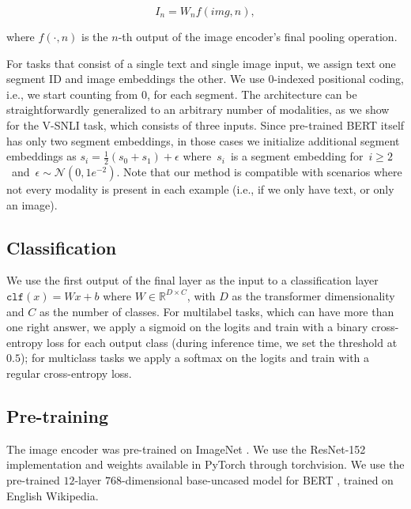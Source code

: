 \documentclass[11pt,a4paper]{article}
\begin{document}
\begin{equation}
    I_n = W_n f(img, n),
\end{equation}

where $f(\cdot, n)$ is the $n$-th output of the image encoder's final pooling operation.

For tasks that consist of a single text and single image input, we assign text one segment ID and image embeddings the other. We use $0$-indexed positional coding, i.e., we start counting from $0$, for each segment. The architecture can be straightforwardly generalized to an arbitrary number of modalities, as we show for the V-SNLI task, which consists of three inputs. Since pre-trained BERT itself has only two segment embeddings, in those cases we initialize additional segment embeddings as $s_i=\frac{1}{2}(s_0+s_1)+\epsilon$ where~$s_i$~is a segment embedding for~$i\geq 2$~and~$\epsilon\sim\mathcal{N}(0,1e^{-2})$. Note that our method is compatible with scenarios where not every modality is present in each example (i.e., if we only have text, or only an image).

\subsection{Classification} We use the first output of the final layer as the input to a classification layer $\mathtt{clf}(x) = W x + b$ where $W\in\mathbb{R}^{D\times C}$, with $D$ as the transformer dimensionality and $C$ as the number of classes. For multilabel tasks, which can have more than one right answer, we apply a sigmoid on the logits and train with a binary cross-entropy loss for each output class (during inference time, we set the threshold at $0.5$); for multiclass tasks we apply a softmax on the logits and train with a regular cross-entropy loss.

\subsection{Pre-training} The image encoder was pre-trained on ImageNet \cite{Deng:2009imagenet}. We use the ResNet-152 \cite{He:2016cvpr} implementation and weights available in PyTorch \cite{Paszke:2017pytorch} through torchvision. We use the pre-trained $12$-layer $768$-dimensional base-uncased model for BERT \cite{Devlin:2019naacl}, trained on English Wikipedia.
\end{document}
